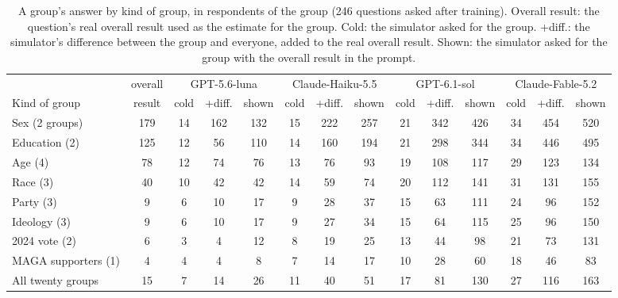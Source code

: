 \begin{table}[h]
\centering\small
\setlength{\tabcolsep}{3.4pt}
\begin{tabular}{lccccccccccccc}
\toprule
 & overall & \multicolumn{3}{c}{GPT-5.6-luna} & \multicolumn{3}{c}{Claude-Haiku-5.5} & \multicolumn{3}{c}{GPT-6.1-sol} & \multicolumn{3}{c}{Claude-Fable-5.2} \\
\cmidrule(lr){3-5}\cmidrule(lr){6-8}\cmidrule(lr){9-11}\cmidrule(lr){12-14}
Kind of group & result & cold & +diff. & shown & cold & +diff. & shown & cold & +diff. & shown & cold & +diff. & shown \\
\midrule
Sex (2 groups) & 179 & 14 & 162 & 132 & 15 & 222 & 257 & 21 & 342 & 426 & 34 & 454 & 520 \\
Education (2) & 125 & 12 & 56 & 110 & 14 & 160 & 194 & 21 & 298 & 344 & 34 & 446 & 495 \\
Age (4) & 78 & 12 & 74 & 76 & 13 & 76 & 93 & 19 & 108 & 117 & 29 & 123 & 134 \\
Race (3) & 40 & 10 & 42 & 42 & 14 & 59 & 74 & 20 & 112 & 141 & 31 & 131 & 155 \\
Party (3) & 9 & 6 & 10 & 17 & 9 & 28 & 37 & 15 & 63 & 111 & 24 & 96 & 152 \\
Ideology (3) & 9 & 6 & 10 & 17 & 9 & 27 & 34 & 15 & 64 & 115 & 25 & 96 & 150 \\
2024 vote (2) & 6 & 3 & 4 & 12 & 8 & 19 & 25 & 13 & 44 & 98 & 21 & 73 & 131 \\
MAGA supporters (1) & 4 & 4 & 4 & 8 & 7 & 14 & 17 & 10 & 28 & 60 & 18 & 46 & 83 \\
\midrule
All twenty groups & 15 & 7 & 14 & 26 & 11 & 40 & 51 & 17 & 81 & 130 & 27 & 116 & 163 \\
\bottomrule
\end{tabular}
\caption{A group's answer by kind of group, in respondents of the group (246 questions asked after training). Overall result: the question's real overall result used as the estimate for the group. Cold: the simulator asked for the group. +diff.: the simulator's difference between the group and everyone, added to the real overall result. Shown: the simulator asked for the group with the overall result in the prompt.}
\label{tab:grp20}
\end{table}
